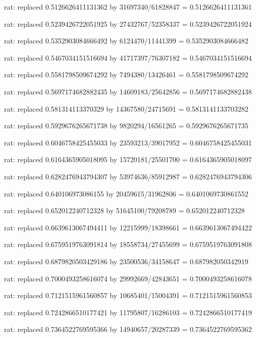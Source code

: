 \documentclass[a4paper,10pt]{article}
\begin{document}
\begin{eulernotebook}
\begin{eulercomment}
\begin{eulercomment}
\begin{eulercomment}
\begin{eulercomment}
\begin{eulercomment}
\begin{eulercomment}
\begin{eulercomment}
\begin{eulercomment}
\begin{eulercomment}
\begin{eulercomment}
\begin{eulercomment}
\begin{eulercomment}
\begin{eulercomment}
\begin{eulercomment}
\begin{eulercomment}
\begin{eulercomment}
\begin{euleroutput}
  rat: replaced 0.5126626411131362 by 31697340/61828847 = 0.5126626411131361
  
  rat: replaced 0.5239426722051925 by 27432767/52358337 = 0.5239426722051924
  
  rat: replaced 0.5352903084666492 by 6124470/11441399 = 0.5352903084666482
  
  rat: replaced 0.5467034151516694 by 41717397/76307182 = 0.5467034151516694
  
  rat: replaced 0.5581798509674292 by 7494380/13426461 = 0.5581798509674292
  
  rat: replaced 0.5697174682882435 by 14609183/25642856 = 0.5697174682882438
  
  rat: replaced 0.581314113370329 by 14367580/24715691 = 0.5813141133703282
  
  rat: replaced 0.5929676265671738 by 9820294/16561265 = 0.5929676265671735
  
  rat: replaced 0.6046758425455033 by 23593213/39017952 = 0.6046758425455031
  
  rat: replaced 0.6164365905018095 by 15720181/25501700 = 0.6164365905018097
  
  rat: replaced 0.6282476943794307 by 53974636/85912987 = 0.6282476943794306
  
  rat: replaced 0.640106973086155 by 20459615/31962806 = 0.6401069730861552
  
  rat: replaced 0.652012240712328 by 51645100/79208789 = 0.652012240712328
  
  rat: replaced 0.6639613067494411 by 12215999/18398661 = 0.6639613067494422
  
  rat: replaced 0.6759519763091814 by 18558734/27455699 = 0.6759519763091808
  
  rat: replaced 0.6879820503429186 by 23500536/34158647 = 0.687982050342919
  
  rat: replaced 0.7000493258616074 by 29992669/42843651 = 0.7000493258616078
  
  rat: replaced 0.7121515961560857 by 10685401/15004391 = 0.7121515961560853
  
  rat: replaced 0.7242866510177421 by 11795807/16286103 = 0.7242866510177419
  
  rat: replaced 0.7364522769595366 by 14940657/20287339 = 0.7364522769595362
  

\end{euleroutput}
\end{eulercomment}
\end{eulercomment}
\end{eulercomment}
\end{eulercomment}
\end{eulercomment}
\end{eulercomment}
\end{eulercomment}
\end{eulercomment}
\end{eulercomment}
\end{eulercomment}
\end{eulercomment}
\end{eulercomment}
\end{eulercomment}
\end{eulercomment}
\end{eulercomment}
\end{eulercomment}
\end{eulernotebook}
\end{document}
